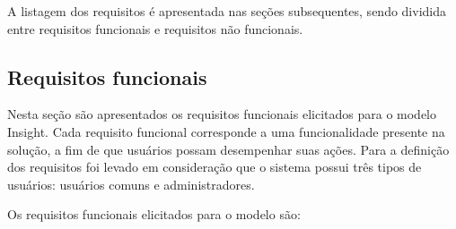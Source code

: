 \documentclass[english,brazilian]{UNISINOSmonografia}
\begin{document}
A listagem dos requisitos é apresentada nas seções subsequentes, sendo dividida entre requisitos funcionais e requisitos não funcionais.

\subsection{Requisitos funcionais} 
Nesta seção são apresentados os requisitos funcionais elicitados para o modelo Insight. Cada requisito funcional corresponde a uma funcionalidade presente na solução, a fim de que usuários possam desempenhar suas ações. Para a definição dos requisitos foi levado em consideração que o sistema possui três tipos de usuários: usuários comuns e administradores.

Os requisitos funcionais elicitados para o modelo são:
\end{document}
